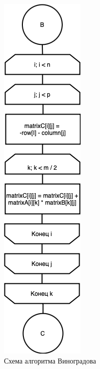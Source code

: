 \begin{figure}[h]
    \centering
    \includegraphics[width=0.3\linewidth]{img/WinogradPrC.jpg}
    \caption{Схема алгоритма Виноградова}
    \label{fig:mpr}
\end{figure}

